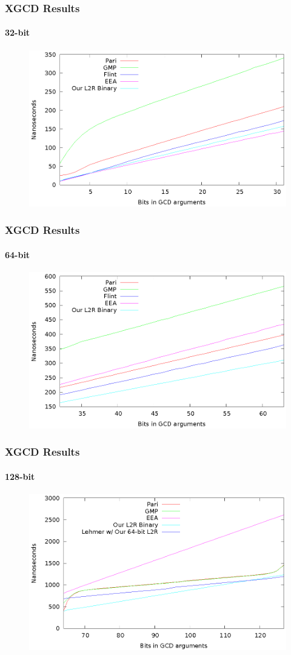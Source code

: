 \documentclass{beamer}
\begin{document}
\begin{frame}
\frametitle{XGCD Results}
\framesubtitle{32-bit}
\begin{figure}
\includegraphics[scale=0.86]{xgcd-best-32}
\end{figure}
\end{frame}
\begin{frame}
\frametitle{XGCD Results}
\framesubtitle{64-bit}
\begin{figure}
\includegraphics[scale=0.86]{xgcd-best-64}
\end{figure}
\end{frame}
\begin{frame}
\frametitle{XGCD Results}
\framesubtitle{128-bit}
\begin{figure}
\includegraphics[scale=0.86]{xgcd-best-128}
\end{figure}
\end{frame}
\end{document}
